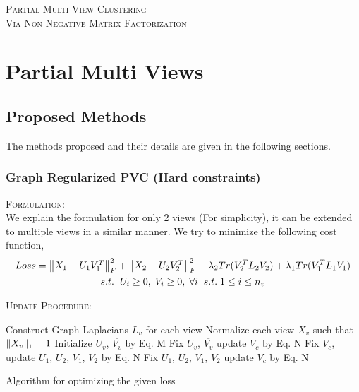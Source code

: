 \documentclass[a4paper]{article}
\begin{document}
	\begin{center}
	\huge{\textsc{Partial Multi View Clustering}}\\
	\large{\textsc{Via Non Negative Matrix Factorization}}	
	\end{center}
	
	\vspace{5mm}

	\section{Partial Multi Views}

	\subsection{Proposed Methods}
	
	The methods proposed and their details are given in the following sections.	
	
	\subsubsection{Graph Regularized PVC (Hard constraints)}
	
	\textsc{Formulation:}\\
	We explain the formulation for only 2 views (For simplicity), it can be extended to multiple views in a similar manner. We try to minimize the following cost function,
	\begin{multline}
	Loss = \begin{Vmatrix} X_{1}-U_{1}V^{T}_{1} \end{Vmatrix}^{2}_{F}	
		+ \begin{Vmatrix} X_{2}-U_{2}V^{T}_{2} \end{Vmatrix}^{2}_{F}
		+ \lambda_{2}Tr(V^{T}_{2}L_{2}V_{2}) + \lambda_{1}Tr(V^{T}_{1}L_{1}V_{1}) \\	
		s.t. \hspace{2mm}  U_{i}\geq0,\;V_{i}\geq0,\;\forall i \;\;s.t.\; 1 \leq i \leq n_{v}\\
	\end{multline}
	
	\noindent
	\textsc{Update Procedure:}

	\begin{algorithm}
		Construct Graph Laplacians $L_{v}$ for each view\;
		Normalize each view $X_{v}$ such that $\|X_{v}\|_{\text{\tiny1}} = 1 $\;
		Initialize  $U_{v}$, $\overline{V_{v}}$ by Eq. M\;
		Fix $U_{v}$, $\overline{V_{v}}$ update $V_{c}$ by Eq. N\;		
		{
			{
				Fix $V_{c}$, update $U_{1}$, $U_{2}$, $\overline{V_{1}}$, $\overline{V_{2}}$ by Eq. N\;
			}
			Fix $U_{1}$, $U_{2}$, $\overline{V_{1}}$, $\overline{V_{2}}$ update $V_{c}$ by Eq. N\;
		}						
		\caption{Algorithm for optimizing the given loss}
	\end{algorithm}
\end{document}
